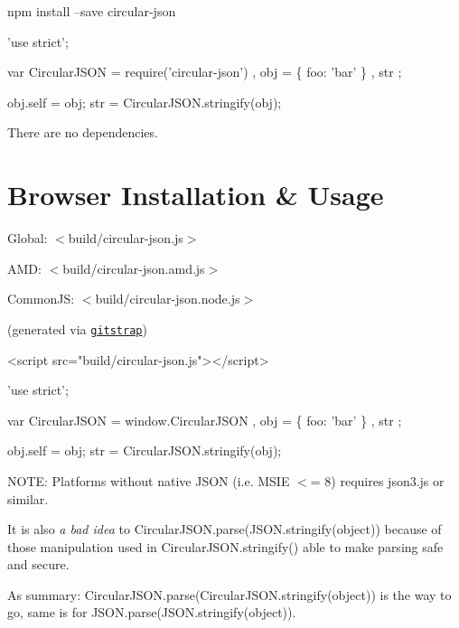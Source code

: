 \begin{DoxyCode}
npm install --save circular-json
\end{DoxyCode}



\begin{DoxyCode}
'use strict';

var CircularJSON = require('circular-json')
  , obj = \{ foo: 'bar' \}
  , str
  ;

obj.self = obj;
str = CircularJSON.stringify(obj);
\end{DoxyCode}


There are no dependencies.

\section*{Browser Installation \& Usage }


\begin{DoxyItemize}
\item Global\+: $<$build/circular-\/json.\+js$>$
\item A\+MD\+: $<$build/circular-\/json.\+amd.\+js$>$
\item Common\+JS\+: $<$build/circular-\/json.\+node.\+js$>$
\end{DoxyItemize}

(generated via \href{https://github.com/WebReflection/gitstrap}{\tt gitstrap})


\begin{DoxyCode}
<script src="build/circular-json.js"></script>
\end{DoxyCode}



\begin{DoxyCode}
'use strict';

var CircularJSON = window.CircularJSON
  , obj = \{ foo: 'bar' \}
  , str
  ;

obj.self = obj;
str = CircularJSON.stringify(obj);
\end{DoxyCode}


N\+O\+TE\+: Platforms without native J\+S\+ON (i.\+e. M\+S\+IE $<$= 8) requires {\ttfamily json3.\+js} or similar.

It is also {\itshape a bad idea} to {\ttfamily Circular\+J\+S\+O\+N.\+parse(J\+S\+O\+N.\+stringify(object))} because of those manipulation used in {\ttfamily Circular\+J\+S\+O\+N.\+stringify()} able to make parsing safe and secure.

As summary\+: {\ttfamily Circular\+J\+S\+O\+N.\+parse(Circular\+J\+S\+O\+N.\+stringify(object))} is the way to go, same is for {\ttfamily J\+S\+O\+N.\+parse(J\+S\+O\+N.\+stringify(object))}.

